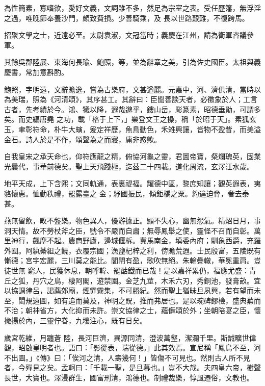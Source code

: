 \begin{pinyinscope}
 為性簡素，寡嗜欲，愛好文義，文詞雖不多，然足為宗室之表。受任歷籓，無浮淫之過，唯晚節奉養沙門，頗致費損。少善騎乘，及
 長以世路艱難，不復跨馬。



 招聚文學之士，近遠必至。太尉袁淑，文冠當時；義慶在江州，請為衛軍咨議參軍。



 其餘吳郡陸展、東海何長瑜、鮑照，等，並為辭章之美，引為佐史國臣。太祖與義慶書，常加意斟酌。



 鮑照，字明遠，文辭贍逸，嘗為古樂府，文甚遒麗。元嘉中，河、濟俱清，當時以為美瑞，照為《河清頌》，其序甚工。其辭曰：臣聞善談天者，必徵象於人；工言古者，先考績於今。鴻、犧以降，遐哉邈乎，鏤山岳，彫篆素，昭德垂勛，可謂多矣。而史編唐堯
 之功，載「格于上下，」樂登文王之操，稱「於昭于天」。素狐玄玉，聿彰符命，朴牛大螾，爰定祥歷，魚鳥動色，禾雉興讓，皆物不盈眥，而美溢金石。詩人於是不作，頌聲為之而寢，庸非惑歟。



 自我皇宋之承天命也，仰符應龍之精，俯協河龜之靈，君圖帝寶，粲爛瑰英，固業光曩代，事華前德矣。聖上天飛踐極，迄茲二十四載。道化周流，玄澤汪水歲。



 地平天成，上下含熙；文同軌通，表裏禔福。耀德中區，黎庶知讓；觀英遐表，夷貉懷惠。恤勤秩禮，罷露臺之
 金；紓國振民，傾鉅橋之粟。約違迫脅，奢去泰甚。



 燕無留飲，畋不盤樂。物色異人，優游據正。顯不失心，幽無怨氣。精炤日月，事洞天情。故不勞杖斧之臣，號令不嚴而自肅；無辱鳳舉之使，靈怪不召而自彰。萬里神行，飆塵不起。農商野廬，邊城偃柝。冀馬南金，填委內府；馴象西爵，充羅外囿。阿紈綦組之饒，衣覆宗國；漁鹽杞梓之利，傍贍荒遐。士民殷富，五陵既有慚德；宮宇宏麗，三川莫之能比。閭閈有盈，歌吹無絕。朱輪疊轍，華冕重肩。豈徒世無
 窮人，民獲休息，朝呼韓、罷酤鐵而已哉！是以嘉祥累仍，福應尤盛：青丘之狐，丹穴之鳥，棲阿閣，遊禁園。金芝九莖，木禾六刃，秀銅池，發膏畝。宜以協調律呂，謁薦郊廟，煙霏霧集，不可勝紀。然而聖上猶昧旦夙興，若有望而未至，閎規遠圖，如有追而莫及，神明之貺，推而弗居也。是以琬碑鏐檢，盛典蕪而不治；朝神省方，大化抑而未許。崇文協律之士，蘊儛頌於外；坐朝陪宴之臣，懷揄揚於內，三靈佇眷，九壤注心，既有日矣。



 歲宮乾維，月躔蒼
 陸，長河巨濟，異源同清，澄波萬壑，潔瀾千里。斯誠曠世偉觀，昭啟皇明者也。語曰：「影從表，瑞從德。」此其效焉。宣尼稱「鳳鳥不至，河不出圖。」《傳》曰：「俟河之清，人壽幾何！」皆傷不可見也。然則古人所不見者，今殫見之矣。孟軻曰：「千載一聖，是旦暮也。」豈不大哉。夫四皇六帝，樹聲長世，大寶也。澤浸群生，國富刑清，鴻德也。制禮裁樂，惇風遷俗，文教也。




\end{pinyinscope}
